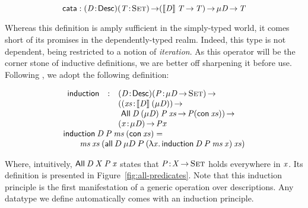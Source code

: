 \[
\F{cata} : \PITEL{\V{D}}{\Desc}
           \PI{\V{T}}{\Set}
           (\descop{\V{D}}{\V{T}} \To \V{T}) \To 
           \Mu{\V{D}} \To \V{T} 
\]

Whereas this definition is amply sufficient in the simply-typed world,
it comes short of its promises in the dependently-typed realm. Indeed,
this type is not dependent, being restricted to a notion of
\emph{iteration}. As this operator will be the corner stone of
inductive definitions, we are better off sharpening it before use.
Following \citet{benke:universe-generic-prog}, we adopt the following
definition:

\[\stk{
\begin{array}{lcl}
\F{induction} & : & \PITEL{\V{D}}{\Desc}
                    \PI{\V{P}}{\Mu{\V{D}} \To \Set}         \\
              &   & (\PI{\V{xs}}{\descop{\V{D}}{(\Mu{\V{D}})}}              \\
              &   & \ \All{\V{D}}{(\Mu{\V{D}})}{\V{P}}{\V{xs}} \To \V{P} (\Con{\V{xs}})) \To \\
              &   & \PI{\V{x}}{\Mu{\V{D}}} \V{P} \V{x} 
\end{array} \\
\F{induction}\: \V{D}\: \V{P}\: \V{ms}\: (\Con{\V{xs}}) =  \\
\qquad
    \V{ms}\: \V{xs}\: (\all{D}{\Mu{D}}{P}
                           {(\LAM{\V{x}} \F{induction}\: \V{D}\: \V{P}\: \V{ms}\: \V{x})}
                           {\V{xs}})
}\]

Where, intuitively, $\All{\V{D}}{\V{X}}{\V{P}}{\V{x}}$ states that
$\Bhab{\V{P}}{\V{X} \To \Set}$ holds everywhere in $\V{x}$. Its
definition is presented in Figure~\ref{fig:all-predicates}. Note that
this induction principle is the first manifestation of a generic
operation over descriptions. Any datatype we define automatically
comes with an induction principle.


